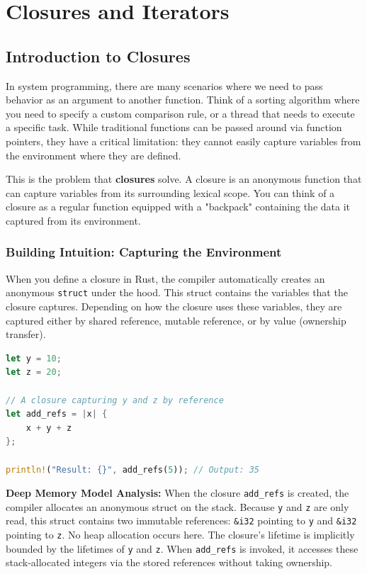 \chapter{Closures and Iterators}

\section{Introduction to Closures}

In system programming, there are many scenarios where we need to pass behavior as an argument to another function. Think of a sorting algorithm where you need to specify a custom comparison rule, or a thread that needs to execute a specific task. While traditional functions can be passed around via function pointers, they have a critical limitation: they cannot easily capture variables from the environment where they are defined.

This is the problem that \textbf{closures} solve. A closure is an anonymous function that can capture variables from its surrounding lexical scope. You can think of a closure as a regular function equipped with a "backpack" containing the data it captured from its environment.

\subsection{Building Intuition: Capturing the Environment}

When you define a closure in Rust, the compiler automatically creates an anonymous \texttt{struct} under the hood. This struct contains the variables that the closure captures. Depending on how the closure uses these variables, they are captured either by shared reference, mutable reference, or by value (ownership transfer).

\begin{lstlisting}[language=Rust]
let y = 10;
let z = 20;

// A closure capturing y and z by reference
let add_refs = |x| {
    x + y + z 
};

println!("Result: {}", add_refs(5)); // Output: 35
\end{lstlisting}

\textbf{Deep Memory Model Analysis:} When the closure \texttt{add\_refs} is created, the compiler allocates an anonymous struct on the stack. Because \texttt{y} and \texttt{z} are only read, this struct contains two immutable references: \texttt{\&i32} pointing to \texttt{y} and \texttt{\&i32} pointing to \texttt{z}. No heap allocation occurs here. The closure's lifetime is implicitly bounded by the lifetimes of \texttt{y} and \texttt{z}. When \texttt{add\_refs} is invoked, it accesses these stack-allocated integers via the stored references without taking ownership.

